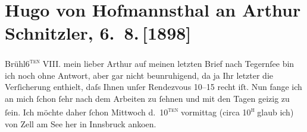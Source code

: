 

         
         \renewcommand{\erwaehntePersonen}{Personen: Hugo von Hofmannsthal}
         \renewcommand{\erwaehnteOrte}{Orte: Bad Fusch, Bregenz, Hauptbahnhof, Hinterbrühl, Innsbruck, Salesianergasse, Tegernsee, Wien, Zell am See}
         \renewcommand{\erwaehnteWerke}{}
               \section[Hugo von Hofmannsthal an Arthur Schnitzler, 6. 8. {[}1898{]}]{ Hugo von Hofmannsthal an Arthur Schnitzler, 6. 8. {[}1898{]}}\nopagebreak{}\rehead{ }\begin{ledgroupsized}[t]{13cm}\normalsize\beginnumbering{} \toendnotes[C]{\smallbreak\pagebreak[2]} 
\toendnotes[C]{\smallbreak}\pstart
           \raggedleft{}{\pb}Brühl6\textsc{\textsuperscript{ten}} VIII.\pend
           \pstart{}mein lieber Arthur\pend\pstart
           auf meinen letzten Brief \introOben{}nach Tegernſee\introOben{} bin ich noch ohne Antwort, aber gar nicht beunruhigend, da ja Ihr letzter die
               Verſicherung enthielt, daſs Ihnen unſer Rendezvous 10–15
               recht iſt. Nun fange ich an mich ſchon ſehr nach dem Arbeiten zu ſehnen und mit den
               Tagen geizig zu ſein.\pend
           \pstart
           {\pb}Ich möchte daher ſchon
                  Mittwoch d. 10\textsc{\textsuperscript{ten}} vormittag (circa 10\textsc{\textsuperscript{h}} glaub ich) von Zell am See her in Innsbruck anko{\geminationm}en.

\end{ledgroupsized}

